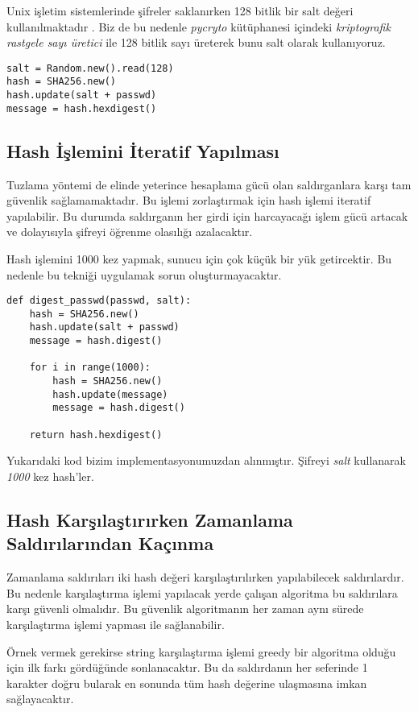 \documentclass[11pt]{report}
\begin{document}
Unix işletim sistemlerinde şifreler saklanırken 128 bitlik bir salt değeri kullanılmaktadır \cite{unixsalt}. Biz de bu nedenle \emph{pycryto} kütüphanesi içindeki \emph{kriptografik rastgele sayı üretici} ile 128 bitlik sayı üreterek bunu salt olarak kullanıyoruz.

\begin{lstlisting}[caption=Python salt ile SHA256 Kullanımı]
salt = Random.new().read(128)
hash = SHA256.new()
hash.update(salt + passwd)
message = hash.hexdigest()
\end{lstlisting}


\subsection{Hash İşlemini İteratif Yapılması}

Tuzlama yöntemi de elinde yeterince hesaplama gücü olan saldırganlara karşı tam güvenlik sağlamamaktadır. Bu işlemi zorlaştırmak için hash işlemi iteratif yapılabilir. Bu durumda saldırganın her girdi için harcayacağı işlem gücü artacak ve dolayısıyla şifreyi öğrenme olasılığı azalacaktır.

Hash işlemini 1000 kez yapmak, sunucu için çok küçük bir yük getircektir. Bu nedenle bu tekniği uygulamak sorun oluşturmayacaktır.

\begin{lstlisting}[caption=Python iteratif SHA256 Kullanımı]
def digest_passwd(passwd, salt):
    hash = SHA256.new()
    hash.update(salt + passwd)
    message = hash.digest()

    for i in range(1000):
        hash = SHA256.new()
        hash.update(message)
        message = hash.digest()

    return hash.hexdigest()
\end{lstlisting}

Yukarıdaki kod bizim implementasyonumuzdan alınmıştır. Şifreyi \emph{salt} kullanarak \emph{1000} kez hash'ler.
\subsection{Hash Karşılaştırırken Zamanlama Saldırılarından Kaçınma}
Zamanlama saldırıları iki hash değeri karşılaştırılırken yapılabilecek saldırılardır. Bu nedenle karşılaştırma işlemi yapılacak yerde çalışan algoritma bu saldırılara karşı güvenli olmalıdır. Bu güvenlik algoritmanın her zaman aynı sürede karşılaştırma işlemi yapması ile sağlanabilir.

Örnek vermek gerekirse string karşılaştırma işlemi greedy bir algoritma olduğu için ilk farkı gördüğünde sonlanacaktır. Bu da saldırdanın her seferinde 1 karakter doğru bularak en sonunda tüm hash değerine ulaşmasına imkan sağlayacaktır.
\end{document}
